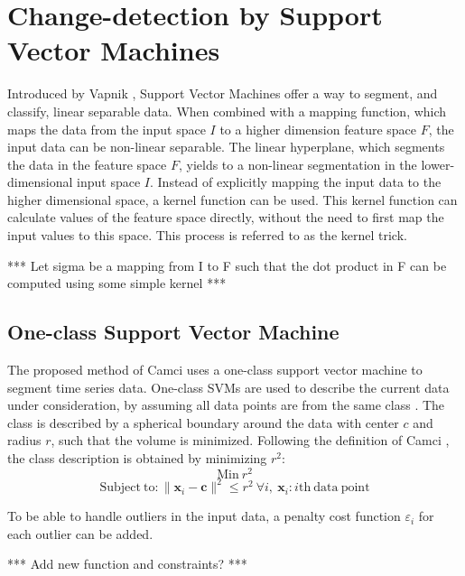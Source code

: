 \section{Change-detection by Support Vector Machines}\label{svm}

Introduced by Vapnik \cite{vapnik1998statistical, vapnik1999nature}, Support Vector Machines offer a way to segment, and classify, linear separable data.
When combined with a mapping function, which maps the data from the input space $I$ to a higher dimension feature space $F$, the input data can be non-linear separable.
The linear hyperplane, which segments the data in the feature space $F$, yields to a non-linear segmentation in the lower-dimensional input space $I$.
Instead of explicitly mapping the input data to the higher dimensional space, a kernel function can be used.
This kernel function can calculate values of the feature space directly, without the need to first map the input values to this space.
This process is referred to as the kernel trick.

*** Let sigma be a mapping from I to F such that the dot product in F can be computed using some simple kernel ***

\subsection{One-class Support Vector Machine}
The proposed method of Camci \cite{camci2010change} uses a one-class support vector machine to segment time series data.
One-class SVMs are used to describe the current data under consideration, by assuming all data points are from the same class \cite{tax2001one}.
The class is described by a spherical boundary around the data with center $c$ and radius $r$, such that the volume is minimized.
Following the definition of Camci \cite{camci2010change}, the class description is obtained by minimizing $r^2$:
\begin{equation}
  \mathrm{Min}\ r^2
\end{equation}
\begin{equation}
  \mathrm{Subject\ to} : \|\mathbf{x}_i - \mathbf{c}\|^2 \le r^2\ \forall i,\ \mathbf{x}_i : i \mathrm{th\ data\ point}
\end{equation}

To be able to handle outliers in the input data, a penalty cost function $\varepsilon_i$ for each outlier can be added.

*** Add new function and constraints? ***

